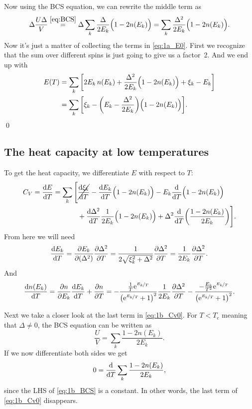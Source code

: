 \documentclass[11pt,letter, swedish, english
]{article}
\newcommand{\Tc}{\ensuremath{T_{\text{c}}}}
\begin{document}
Now using the BCS equation, we can rewrite the middle
term as
\begin{equation}
\Delta\frac{U\Delta}{V} \stackrel{\eqref{eq:BCS}}{=}
\Delta\sum_k \frac{\Delta}{2E_k}\Big(1-2n(E_k)\Big)
=\sum_k \frac{\Delta^2}{2E_k}\Big(1-2n(E_k)\Big).
\end{equation}
Now it's just a matter of collecting the terms in
\eqref{eq:1a_E0}. First we recognize that the sum over different spins
is just going to give us a factor~2. And we end up with
\begin{equation}
\begin{aligned}
E(T)&=\sum_k\qty[2E_k\,n(E_k)
+\frac{\Delta^2}{2E_k}\Big(1-2n(E_k)\Big)
+\xi_k-E_k ]\\
&=\sum_k\qty[
\xi_k-\qty(E_k-\frac{\Delta^2}{2E_k})\Big(1-2n(E_k)\Big) ].
\end{aligned}
\end{equation}
\qed

\subsection{The heat capacity at low temperatures}
To get the heat capacity, we differentiate $E$ with respect to $T$:
\begin{equation}\label{eq:1b_Cv0}
\begin{aligned}
C_V=\dv{E}{T}=\sum_k\Bigg[&
\cancel{\dv{\xi_k}{T}}-\dv{E_k}{T}\Big(1-2n(E_k)\Big)
-E_k\dv{T}\Big(1-2n(E_k)\Big)\\
&+\dv{\Delta^2}{T}\frac{1}{2E_k}\Big(1-2n(E_k)\Big) 
+\Delta^2 \dv{T}\qty(\frac{1-2n(E_k)}{2E_k})
\Bigg].
\end{aligned}
\end{equation}
From here we will need 
\begin{equation}\label{eq:1b_dEk/dT}
\dv{E_k}{T}=\pdv{E_k}{(\Delta^2)}\pdv{\Delta^2}{T}
=\frac{1}{2\sqrt{\xi_k^2+\Delta^2}}\pdv{\Delta^2}{T}
=\frac{1}{2E_k}\pdv{\Delta^2}{T}.
\end{equation}
And
\begin{equation}\label{eq:1b_dn/dT}
\dv{n(E_k)}{T}=\pdv{n}{E_k}\dv{E_k}{T}+\pdv{n}{T}
=-\frac{\frac{1}{T}\mathrm{e}^{\nicefrac{E_k}{T}}}
{\qty(\mathrm{e}^{\nicefrac{E_k}{T}}+1)^2}\frac{1}{2E_k}\pdv{\Delta^2}{T}
-\frac{-\frac{E_k}{T^2}\mathrm{e}^{\nicefrac{E_k}{T}}}
{\qty(\mathrm{e}^{\nicefrac{E_k}{T}}+1)^2}.
\end{equation}

Next we take a closer look at the last term in \eqref{eq:1b_Cv0}. For
$T<\Tc$ meaning that $\Delta\neq0$, the BCS equation can be written as
\begin{equation}\label{eq:1b_BCS}
\frac{U}{V}=\sum_k\frac{1-2n(E_k)}{2E_k}.
\end{equation}
If we now differentiate both sides we get
\begin{equation}
0=\dv{T}\sum_k\frac{1-2n(E_k)}{2E_k},
\end{equation}
since the LHS of \eqref{eq:1b_BCS} is a constant. In other words, the
last term of \eqref{eq:1b_Cv0} disappears.
\end{document}
